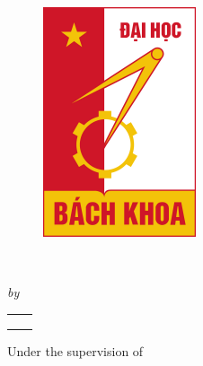 \thispagestyle{empty}
\begin{center}

\vspace{\baselineskip}
    {\bf \MakeUppercase{\University} \par}
    {\bf \MakeUppercase{\college} \par}
\vspace{\baselineskip}

    {\begin{figure}[!h] 
        \centering
        \includegraphics[width=45mm]{./Images/logo/bkhn} 
    \end{figure}
    }
\
    { \LARGE {\bfseries {\ReportTitle}} \par}
\vspace{\baselineskip}
    {\large \bf \Degree \par} 
\vspace{\baselineskip}



{\textit{by} \par}
\vspace{\baselineskip}
\begin{tabular}{c  c}
    \large {\bf\firstAuthor} & \large {\bf\firstAuthorID} \\
    \large {\bf\secondAuthor} & \large {\bf\secondAuthorID} \\
\large {\bf\thirdAuthor} & \large {\bf\thirdAuthorID}
\end{tabular}


\vspace{\baselineskip}
    {Under the supervision of \par}
\vspace{\baselineskip}
    {{\large \bf \Supervisor} \par}


\vspace{1.5\baselineskip}
    {\bf \MakeUppercase{\reportSubmissionTerm} \par}    
    
 \end{center}